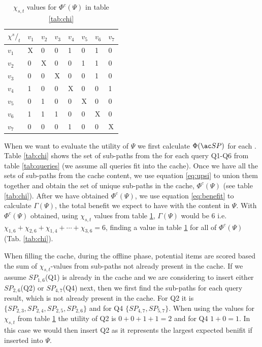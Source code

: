 \begin{table}
\center
\begin{tabular}{|l||l|l|l|l|l|l|l|}
\textbf{$\chi {^s/_t}$}	& $v_1$	& $v_2$	& $v_3$	& $v_4$	& $v_5$	& $v_6$	& $v_7$ \\\hline
$v_1$			& X	& 0	& 0	& 1	& 0	& 1	& 0	 \\
$v_2$			& 0	& X	& 0	& 0	& 1	& 1	& 0	 \\
$v_3$			& 0	& 0	& X	& 0	& 0	& 1	& 0	 \\
$v_4$			& 1	& 0	& 0	& X	& 0	& 0	& 1	 \\
$v_5$			& 0	& 1	& 0	& 0	& X	& 0	& 0	 \\
$v_6$			& 1	& 1	& 1	& 0	& 0	& X	& 0	 \\
$v_7$			& 0	& 0	& 0	& 1	& 0	& 0	& X	 \\
\end{tabular}
\caption{$\chi_{s,t}$ values for $\Phi^c(\Psi)$ in table \ref{tab:chi}}
\label{tab:freq}
\end{table}



When we want to evaluate the utility of $\Psi$ we first calculate $\Phi(\spath)$ for each \spathns. Table \ref{tab:chi} shows the set of sub-paths from the \spaths for each query Q1-Q6 from table \ref{tab:queries} (we assume all queries fit into the cache). Once we have all the sets of sub-paths from the cache content, we use equation \ref{eq:upsi} to union them together and obtain the set of unique sub-paths in the cache, $\Phi^c(\Psi)$ (see table \ref{tab:chi}). After we have obtained $\Phi^c(\Psi)$, we use equation \ref{eq:benefit} to calculate $\Gamma(\Psi)$, the total benefit we expect to have with the content in $\Psi$. With $\Phi^c(\Psi)$ obtained, using $\chi_{s,t}$ values from table \ref{tab:freq}, $\Gamma(\Psi)$ would be 6 i.e. $\chi_{1,6}+\chi_{2,6}+\chi_{1,4}+\dotsb+\chi_{3,6} = 6$, finding a value in table \ref{tab:freq} for all \spaths of $\Phi^c(\Psi)$ (Tab. \ref{tab:chi}).

When filling the cache, during the offline phase, potential \spath items are scored based the sum of $\chi_{s,t}$-values from sub-paths not already present in the cache. If we assume $SP_{1,6}$(Q1) is already in the cache and we are considering to insert either $SP_{2,6}$(Q2) or $SP_{4,7}$(Q4) next, then we first find the sub-paths for each query result, which is not already present in the cache. For Q2 it is $\{SP_{2,3},SP_{2,4},SP_{2,5},SP_{2,6}\}$ and for Q4 $\{SP_{4,7},SP_{5,7}\}$. When using the values for $\chi_{s,t}$ from table \ref{tab:freq} the utility of Q2 is $0+0+1+1=2$ and for Q4 $1+0=1$. In this case we would then insert Q2 as it represents the largest expected benifit if inserted into $\Psi$.

